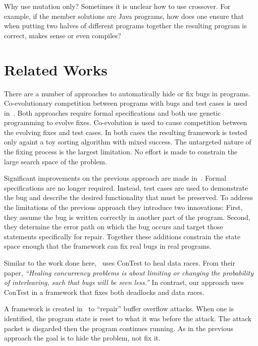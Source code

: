 \documentclass[10pt, conference, compsocconf]{IEEEtran}
\begin{document}
Why use mutation only?  Sometimes it is unclear how to use crossover.  For
example, if the member solutions are Java programs, how does one ensure that
when putting two halves of different programs together the resulting program is
correct, makes sense or even compiles?

\section{Related Works}
\label{sec:related_works}

There are a number of approaches to automatically hide or fix bugs in programs.
Co-evolutionary competition between programs with bugs and test cases is used
in~\cite{AY08, Arc08, WT10}. Both approaches require formal specifications and
both use genetic programming to evolve fixes. Co-evolution is used to cause 
competition between the evolving fixes and test cases. In both cases the 
resulting framework is tested only againt a toy sorting algorithm with mixed 
success. The untargeted nature of the fixing process is the largest limitation. 
No effort is made to constrain the large search space of the problem.

Significant improvements on the previous approach are made in~\cite{FNWG09,
WNLF09, NWLF09, WFGN10, GNFW11}. Formal specifications are no longer required.
Instead, test cases are used to demonstrate the bug and describe the desired
functionality that must be preserved. To address the limitations of the
previous approach they introduce two innovations: First, they assume the bug is
written correctly in another part of the program. Second, they determine the
error path on which the bug occurs and target those statements specifically for
repair. Together these additions constrain the state space enough that the
framework can fix real bugs in real programs.

Similar to the work done here,~\cite{KLT+07, LVK08} uses ConTest to heal data
races. From their paper, \textit{``Healing concurrency problems is about
limiting or changing the probability of interleaving, such that bugs will be
seen less.''} In contrast, our approach uses ConTest in a framework that
fixes both deadlocks and data races.

A framework is created in~\cite{CB05} to ``repair'' buffer overflow attacks.
When one is identified, the program state is reset to what it was before the
attack. The attack packet is disgarded then the program continues running. As
in the previous approach the goal is to hide the problem, not fix it.
\end{document}
